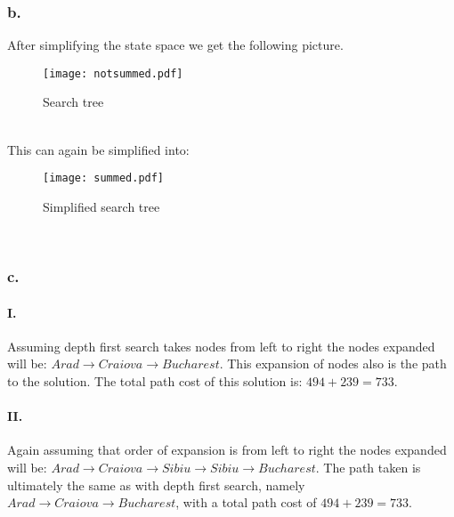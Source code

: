 \documentclass[a4paper]{article}
\begin{document}
\subsubsection*{b.}
After simplifying the state space we get the following picture.\\
\begin{figure}[htp]
\centering
\texttt{[image: notsummed.pdf]}\\
\caption{Search tree}\label{fig:searchtree}
\end{figure}\\
This can again be simplified into:\\
\begin{figure}[htp]
\centering
\texttt{[image: summed.pdf]}\\
\caption{Simplified search tree}\label{fig:searchtreesimple}
\end{figure}\\
\subsubsection*{c.}

\paragraph*{I.}
Assuming depth first search takes nodes from left to right the nodes expanded will be: $Arad \rightarrow Craiova \rightarrow Bucharest$. This expansion of nodes also is the path to the solution. The total path cost of this solution is: $494 + 239 = 733$.

\paragraph*{II.}
Again assuming that order of expansion is from left to right the nodes expanded will be: $Arad \rightarrow Craiova \rightarrow Sibiu \rightarrow Sibiu \rightarrow Bucharest$. The path taken is ultimately the same as with depth first search, namely $Arad \rightarrow Craiova \rightarrow Bucharest$, with a total path cost of $494 + 239 = 733$.
\end{document}
